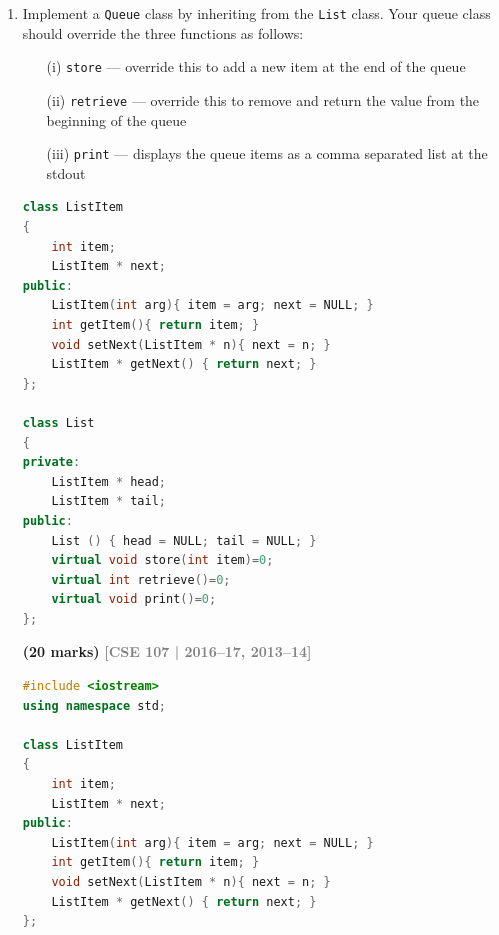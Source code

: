\documentclass[12pt,a3paper]{article}
\newcommand{\yr}[1]{\hfill\textcolor{gray}{\small\textbf{[#1]}}}
\newcommand{\mk}[1]{\textcolor{orange!70!black}{\small\textbf{(#1 marks)}}}
\begin{document}
\begin{enumerate}
\begin{tcolorbox}
\begin{lstlisting}[language=C++]
class A { public: virtual void f()=0; };  // pure virtual
class B : public A { };                   // does NOT override f
// B is still abstract
// B b;   // ERROR: cannot instantiate abstract class B

class C : public A { public: void f(){ cout<<"C::f\n"; } };
C c;       // OK: C implements f
c.f();     // C::f
\end{lstlisting}

\end{tcolorbox}


\item Implement a \texttt{Queue} class by inheriting from the \texttt{List} class. Your queue class should override the three functions as follows:
\begin{itemize}
    \item[(i)] \texttt{store} --- override this to add a new item at the end of the queue
    \item[(ii)] \texttt{retrieve} --- override this to remove and return the value from the beginning of the queue
    \item[(iii)] \texttt{print} --- displays the queue items as a comma separated list at the stdout
\end{itemize}

\begin{lstlisting}[language=C++]
class ListItem
{
    int item;
    ListItem * next;
public:
    ListItem(int arg){ item = arg; next = NULL; }
    int getItem(){ return item; }
    void setNext(ListItem * n){ next = n; }
    ListItem * getNext() { return next; }
};

class List
{
private:
    ListItem * head;
    ListItem * tail;
public:
    List () { head = NULL; tail = NULL; }
    virtual void store(int item)=0;
    virtual int retrieve()=0;
    virtual void print()=0;
};
\end{lstlisting}
\mk{20}
\yr{CSE 107 | 2016--17, 2013--14}
\begin{tcolorbox}[enhanced,breakable,ansbox,colback=cG!4,colframe=cG,
  boxrule=0.8pt,arc=5pt,
  title={\textbf{Answer --- Queue inheriting List --- store, retrieve, print}},
  fonttitle=\bfseries\color{white},colbacktitle=cG]

\begin{lstlisting}[language=C++]
#include <iostream>
using namespace std;

class ListItem
{
    int item;
    ListItem * next;
public:
    ListItem(int arg){ item = arg; next = NULL; }
    int getItem(){ return item; }
    void setNext(ListItem * n){ next = n; }
    ListItem * getNext() { return next; }
};


\end{lstlisting}
\end{tcolorbox}
\end{enumerate}
\end{document}
